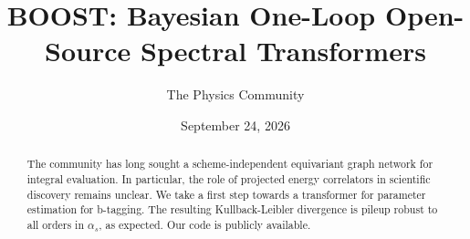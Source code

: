 \documentclass[11pt]{article}
\title{BOOST: Bayesian One-Loop Open-Source Spectral Transformers}
\author{The Physics Community}
\date{September 24, 2026}
\numberwithin{equation}{section}
\theoremstyle{definition}
\theoremstyle{remark}
\begin{document}
\maketitle
\begin{abstract}
The community has long sought a scheme-independent equivariant graph
network for integral evaluation. In particular, the role of projected
energy correlators in scientific discovery remains unclear. We take a
first step towards a transformer for parameter estimation for b-tagging.
The resulting Kullback-Leibler divergence is pileup robust to all orders
in $\alpha_s$, as expected. Our code is publicly available.
\end{abstract}
\tableofcontents





\nocite{*}


\end{document}
